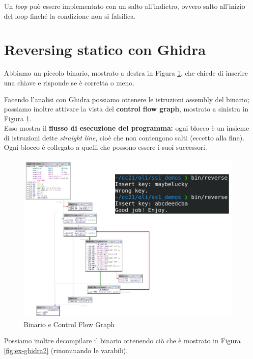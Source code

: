 Un \textit{loop} può essere implementato con un salto all'indietro, ovvero
salto all'inizio del loop finché la condizione non si falsifica.

\section{Reversing statico con Ghidra}

Abbiamo un piccolo binario, mostrato a destra in Figura \ref{fig:ex-ghidra1}, che chiede di inserire una chiave e risponde 
se è corretta o meno.

Facendo l'analisi con Ghidra possiamo ottenere le istruzioni assembly del binario; possiamo inoltre
attivare la vista del \textbf{control flow graph}, mostrato a sinistra in Figura \ref{fig:ex-ghidra1}.\\
Esso mostra il \textbf{flusso di esecuzione 
del programma:} ogni blocco è un insieme di istruzioni dette \textit{straight line}, cioè che non 
contengono salti (eccetto alla fine). Ogni blocco è collegato a quelli che possono essere 
i suoi successori.

\begin{figure}[ht]
    \centering
    \includegraphics[width=1\linewidth]{images/static-ghidra1.png}
    \caption{Binario e Control Flow Graph}
    \label{fig:ex-ghidra1}
\end{figure}

Possiamo inoltre decompilare il binario ottenendo ciò che è mostrato
in Figura \ref{fig:ex-ghidra2} (rinominando le varabili).


